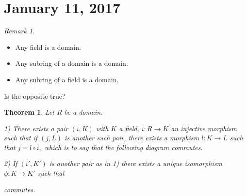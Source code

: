 \documentclass{amsart}
\newtheorem{thm}{Theorem}[section]
\theoremstyle{definition}
\theoremstyle{remark}
\newtheorem*{rmk}{Remark}
\begin{document}
\section{January 11, 2017}
\begin{rmk}
\begin{itemize}
        \item Any field is a domain.
        \item Any subring of a domain is a domain.
        \item Any subring of a field is a domain.
    \end{itemize}
Is the opposite true?
\end{rmk}
\begin{thm}
Let $R$ be a domain.

1) There exists a pair $(i,K)$ with $K$ a field, $i:R\rightarrow K$ an injective morphism such that if $(j,L)$ is another such pair, there exists a morphism $l:K\rightarrow L$ such that $j=l\circ i,$ which is to say that the following diagram commutes.


2) If $(i',K')$ is another pair as in 1) there exists a unique isomorphism $\phi:K\rightarrow K'$ such that

 commutes.

\end{thm}
\end{document}

